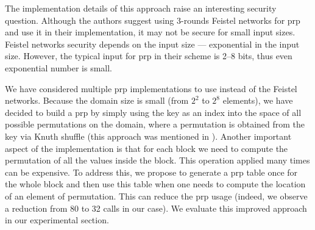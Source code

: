 		The implementation details of this approach raise an interesting security question.
		Although the authors suggest using 3-rounds Feistel networks \cite{unbalanced-feistel} for \acrshort{prp} and use it in their implementation, it may not be secure for small input sizes.
		Feistel networks security depends on the input size \cite{feistel-security} --- exponential in the input size.
		However, the typical input for \acrshort{prp} in their scheme is 2--8 bits, thus even exponential number is small.

		We have considered multiple \acrshort{prp} implementations to use instead of the Feistel networks.
		Because the domain size is small (from $2^2$ to $2^8$ elements), we have decided to build a \acrshort{prp} by simply using the key as an index into the space of all possible permutations on the domain, where a permutation is obtained from the key via Knuth shuffle (this approach was mentioned in \cite{knuth-shuffle-security}).
		Another important aspect of the implementation is that for each block we need to compute the permutation of all the values inside the block.
		This operation applied many times can be expensive.
		To address this, we propose to generate a \acrshort{prp} table once for the whole block and then use this table when one needs to compute the location of an element of permutation.
		This can reduce the \acrshort{prp} usage (indeed, we observe a reduction from 80 to 32 calls in our case).
		We evaluate this improved approach in our experimental section.
